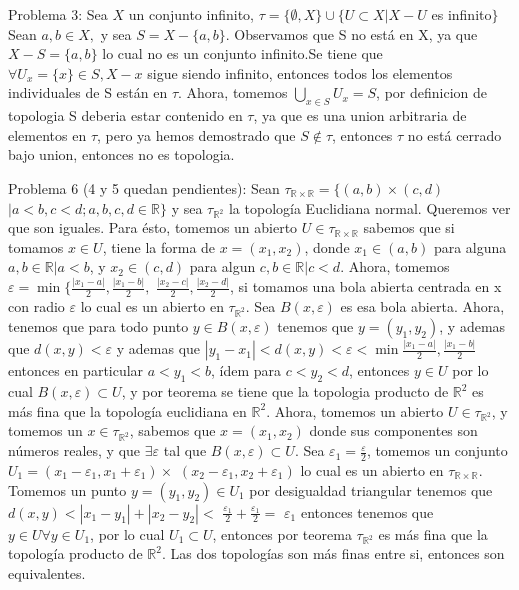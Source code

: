 \documentclass[12pt]{article}
\begin{document}
\hfill \break

Problema 3: \newline
Sea $X$ un conjunto infinito,
$\tau = \{\emptyset, X\} \cup \{U \subset X | X - U$ es infinito$\} $
Sean $a, b \in X,$ y sea $S = X - \{a, b\}$. Observamos que
S no est\'a en X, ya que $X - S = \{a, b\}$ lo cual no es un
conjunto infinito.Se tiene que $\forall U_{x} = \{x\} \in S, X - x$
sigue siendo infinito, entonces todos los
elementos individuales de S est\'an en $\tau$. Ahora, 
tomemos $\bigcup_{x \in S} U_{x} = S$, por definicion de topologia
S deberia estar contenido en $\tau$, ya que es una union arbitraria de
elementos en $\tau$, pero ya hemos demostrado que $S \notin \tau$,
entonces $\tau$ no est\'a cerrado bajo union, entonces no es topologia.\newline

\hfill \break

Problema 6 (4 y 5 quedan pendientes): \newline
Sean $\tau_{\mathbb{R} \times \mathbb{R}} = \{(a, b) \times (c, d)$
$| a < b, c < d; a, b, c, d \in \mathbb{R}\}$ y sea
$\tau_{\mathbb{R}^{2}}$ la topolog\'ia Euclidiana normal. Queremos
ver que son iguales. Para \'esto, tomemos un abierto
$U \in \tau_{\mathbb{R} \times \mathbb{R}}$ sabemos que si tomamos
$x \in U$, tiene la forma de $x = (x_{1}, x_{2})$, donde
$x_{1} \in (a, b)$ para alguna $a, b \in \mathbb{R} | a < b$, y
$x_{2} \in (c, d)$ para algun $c, b \in \mathbb{R} | c < d$.
Ahora, tomemos $\varepsilon = \min\{\frac{|x_{1} - a|}{2}, \frac{|x_{1} - b|}{2},$
$\frac{|x_{2} - c|}{2}, \frac{|x_{2} - d|}{2}$, si tomamos una bola abierta
centrada en x con radio $\varepsilon$ lo cual es un abierto en
$\tau_{\mathbb{R}^{2}}$. Sea $B(x, \varepsilon)$ es esa bola abierta.
Ahora, tenemos que para todo punto $y \in B(x, \varepsilon)$ tenemos
que $y = (y_{1}, y_{2})$, y ademas que $d(x, y) < \varepsilon$ y ademas que
$|y_{1} - x_{1}| < d(x, y) < \varepsilon < \min{\frac{|x_{1} - a|}{2}, \frac{|x_{1} - b|}{2}}$
entonces en particular $a < y_{1} < b$, \'idem para
$c < y_{2} < d$, entonces $y \in U$ por lo cual
$B(x, \varepsilon) \subset U$, y por teorema se tiene
que la topologia producto de $\mathbb{R}^{2}$ es m\'as fina
que la topolog\'ia euclidiana en $\mathbb{R}^{2}$. Ahora, tomemos
un abierto $U \in \tau_{\mathbb{R}^{2}}$, y tomemos un
$x \in \tau_{\mathbb{R}^{2}}$, sabemos que $x = (x_{1}, x_{2})$ donde
sus componentes son n\'umeros reales, y que $\exists\varepsilon$ tal
que $B(x, \varepsilon) \subset U$. Sea
$\varepsilon_{1} = \frac{\varepsilon}{2}$, tomemos un conjunto
$U_{1} = (x_{1} - \varepsilon_{1}, x_{1} + \varepsilon_{1}) \times$
$(x_{2} - \varepsilon_{1}, x_{2} + \varepsilon_{1})$ lo cual
es un abierto en
$\tau_{\mathbb{R} \times \mathbb{R}}$. Tomemos un punto $y = (y_{1}, y_{2}) \in U_{1}$
por desigualdad triangular tenemos que
$d(x, y) < |x_{1} - y_{1}| + |x_{2} - y_{2}| <$
$\frac{\varepsilon_{1}}{2} + \frac{\varepsilon_{1}}{2} =$
$\varepsilon_{1}$ entonces tenemos que $y \in U \forall y \in U_{1}$, por lo cual $U_{1} \subset U$, entonces por teorema
$\tau_{\mathbb{R}^{2}}$ es m\'as fina que la topolog\'ia producto
de $\mathbb{R}^2$. Las dos topolog\'ias son m\'as finas entre si,
entonces son equivalentes. 
\end{document}
